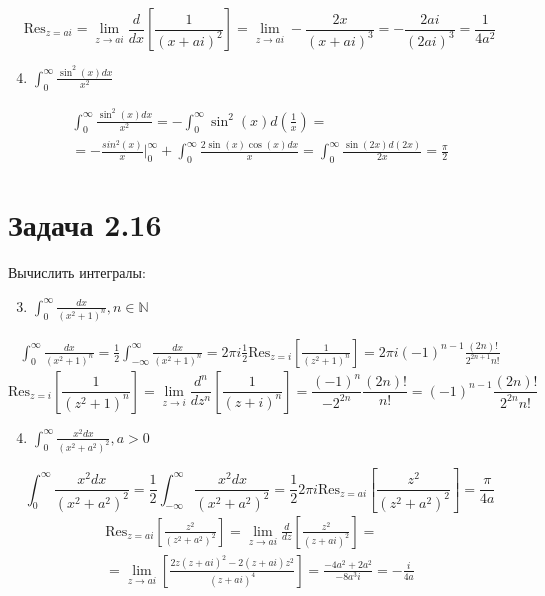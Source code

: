 \documentclass[11pt]{article}
\begin{document}
$$\mathrm{Res}_{z=ai} = \lim_{z \to ai}\frac{d}{dx}\left[\frac{1}{(x + ai)^2}\right] = \lim_{z \to ai}-\frac{2x}{(x + ai)^3} = -\frac{2ai}{(2ai)^3} = \frac{1}{4a^2}$$
\begin{enumerate}
\setcounter{enumi}{3}
\item \(\int_0^\infty\frac{\sin^2(x)dx}{x^2}\)
\end{enumerate}
\begin{multline*}
\int_0^\infty\frac{\sin^2(x)dx}{x^2} = -\int_0^\infty\sin^2(x)d\left(\frac{1}{x}\right) = \\
= -\frac{sin^2(x)}{x}\bigg|_0^\infty + \int_0^\infty\frac{2\sin(x)\cos(x)dx}{x} = \int_0^\infty\frac{\sin(2x)d(2x)}{2x} = \frac{\pi}{2}
\end{multline*}
\section{Задача 2.16}
\label{sec:org0c48112}
Вычислить интегралы:
\begin{enumerate}
\setcounter{enumi}{2}
\item \(\int_0^\infty\frac{dx}{(x^2 + 1)^n}, n \in \mathbb{N}\)
\end{enumerate}
\begin{multline*}
\int_0^\infty\frac{dx}{(x^2+1)^n} = \frac{1}{2}\int_{-\infty}^{\infty}\frac{dx}{(x^2+1)^n}
 = 2\pi i\frac{1}{2}\mathrm{Res}_{z=i}\left[\frac{1}{(z^2+1)^n}\right] = 2\pi i(-1)^{n-1}\frac{(2n)!}{2^{2n+1}n!}
\end{multline*}
$$\mathrm{Res}_{z=i}\left[\frac{1}{(z^2+1)^n}\right] = \lim_{z \to i}\frac{d^n}{dz^n}\left[\frac{1}{(z + i)^n}\right]
 = \frac{(-1)^n}{-2^{2n}}\frac{(2n)!}{n!} = (-1)^{n-1}\frac{(2n)!}{2^{2n}{n!}}$$
\begin{enumerate}
\setcounter{enumi}{3}
\item \(\int_0^\infty\frac{x^2dx}{(x^2+a^2)^2}, a > 0\)
\end{enumerate}
$$\int_0^\infty\frac{x^2dx}{(x^2+a^2)^2} = \frac{1}{2}\int_{-\infty}^\infty\frac{x^2dx}{(x^2+a^2)^2}
 = \frac{1}{2}2\pi i\mathrm{Res}_{z=ai}\left[\frac{z^2}{(z^2+a^2)^2}\right] = \frac{\pi}{4a}$$
\begin{multline*}
\mathrm{Res}_{z=ai}\left[\frac{z^2}{(z^2+a^2)^2}\right] = \lim_{z \to ai}\frac{d}{dz}\left[\frac{z^2}{(z+ai)^2}\right] = \\
 = \lim_{z\to ai}\left[\frac{2z(z+ai)^2 - 2(z+ai)z^2}{(z+ai)^4}\right] = \frac{-4a^2 + 2a^2}{-8a^3i} = -\frac{i}{4a}
\end{multline*}
\end{document}
